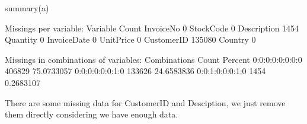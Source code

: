 \begin{Schunk}
\begin{Sinput}
summary(a)
\end{Sinput}
\begin{Soutput}

 Missings per variable: 
    Variable  Count
   InvoiceNo      0
   StockCode      0
 Description   1454
    Quantity      0
 InvoiceDate      0
   UnitPrice      0
  CustomerID 135080
     Country      0

 Missings in combinations of variables: 
    Combinations  Count    Percent
 0:0:0:0:0:0:0:0 406829 75.0733057
 0:0:0:0:0:0:1:0 133626 24.6583836
 0:0:1:0:0:0:1:0   1454  0.2683107
\end{Soutput}
\end{Schunk}

There are some missing data for CustomerID and Desciption, we just
remove them directly considering we have enough data.

